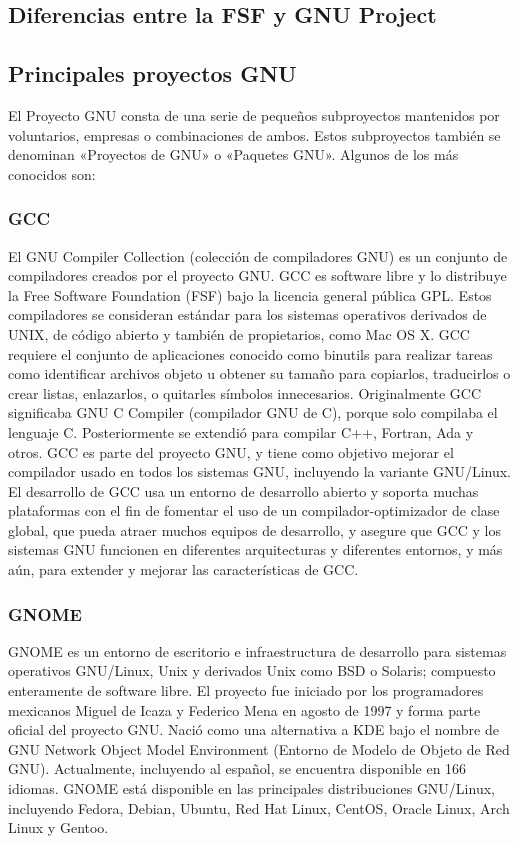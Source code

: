 \subsection{Diferencias entre la FSF y GNU Project}

\subsection{Principales proyectos GNU}
El Proyecto GNU consta de una serie de pequeños subproyectos mantenidos por voluntarios, empresas o combinaciones de ambos. Estos subproyectos también se denominan «Proyectos de GNU» o «Paquetes GNU». Algunos de los más conocidos son:

\subsubsection{GCC}
El GNU Compiler Collection (colección de compiladores GNU) es un conjunto de compiladores creados por el proyecto GNU. GCC es software libre y lo distribuye la Free Software Foundation (FSF) bajo la licencia general pública GPL.
Estos compiladores se consideran estándar para los sistemas operativos derivados de UNIX, de código abierto y también de propietarios, como Mac OS X. GCC requiere el conjunto de aplicaciones conocido como binutils para realizar tareas como identificar archivos objeto u obtener su tamaño para copiarlos, traducirlos o crear listas, enlazarlos, o quitarles símbolos innecesarios.
Originalmente GCC significaba GNU C Compiler (compilador GNU de C), porque solo compilaba el lenguaje C. Posteriormente se extendió para compilar C++, Fortran, Ada y otros.
GCC es parte del proyecto GNU, y tiene como objetivo mejorar el compilador usado en todos los sistemas GNU, incluyendo la variante GNU/Linux. El desarrollo de GCC usa un entorno de desarrollo abierto y soporta muchas plataformas con el fin de fomentar el uso de un compilador-optimizador de clase global, que pueda atraer muchos equipos de desarrollo, y asegure que GCC y los sistemas GNU funcionen en diferentes arquitecturas y diferentes entornos, y más aún, para extender y mejorar las características de GCC.

\subsubsection{GNOME}
GNOME es un entorno de escritorio e infraestructura de desarrollo para sistemas operativos GNU/Linux, Unix y derivados Unix como BSD o Solaris; compuesto enteramente de software libre.
El proyecto fue iniciado por los programadores mexicanos Miguel de Icaza y Federico Mena en agosto de 1997 y forma parte oficial del proyecto GNU. Nació como una alternativa a KDE bajo el nombre de GNU Network Object Model Environment (Entorno de Modelo de Objeto de Red GNU). Actualmente, incluyendo al español, se encuentra disponible en 166 idiomas.
GNOME está disponible en las principales distribuciones GNU/Linux, incluyendo Fedora, Debian, Ubuntu, Red Hat Linux, CentOS, Oracle Linux, Arch Linux y Gentoo.

